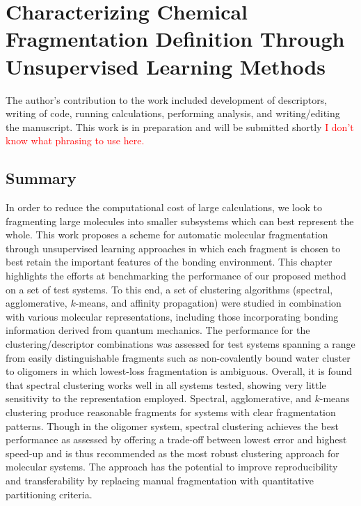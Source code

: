 \chapter{\label{ch:frag_char}Characterizing Chemical Fragmentation Definition Through Unsupervised Learning Methods}


The author's contribution to the work included development of descriptors, writing of code, running calculations, performing analysis, and writing/editing the manuscript. This work is in preparation and will be submitted shortly \textcolor{red}{I don't know what phrasing to use here.}

\section{Summary}
In order to reduce the computational cost of large calculations, we look to fragmenting large molecules into smaller subsystems which can best represent the whole.
This work proposes a scheme for automatic molecular fragmentation through unsupervised learning approaches in which each fragment is chosen to best retain the important features of the bonding environment.
This chapter highlights the efforts at benchmarking the performance of our proposed method on a set of test systems.
To this end, a set of clustering algorithms (spectral, agglomerative, $k$-means, and affinity propagation) were studied in combination with various molecular representations, including those incorporating bonding information derived from quantum mechanics.
The performance for the clustering/descriptor combinations was assessed for test systems spanning a range from easily distinguishable fragments such as non-covalently bound water cluster to oligomers in which lowest-loss fragmentation is ambiguous.
Overall, it is found that spectral clustering works well in all systems tested, showing very little sensitivity to the representation employed.
Spectral, agglomerative, and $k$-means clustering produce reasonable fragments for systems with clear fragmentation patterns. Though in the oligomer system, spectral clustering achieves the best performance as assessed by offering a trade-off between lowest error and highest speed-up and is thus recommended as the most robust clustering approach for molecular systems.
The approach has the potential to improve reproducibility and transferability by replacing manual fragmentation with quantitative partitioning criteria.
